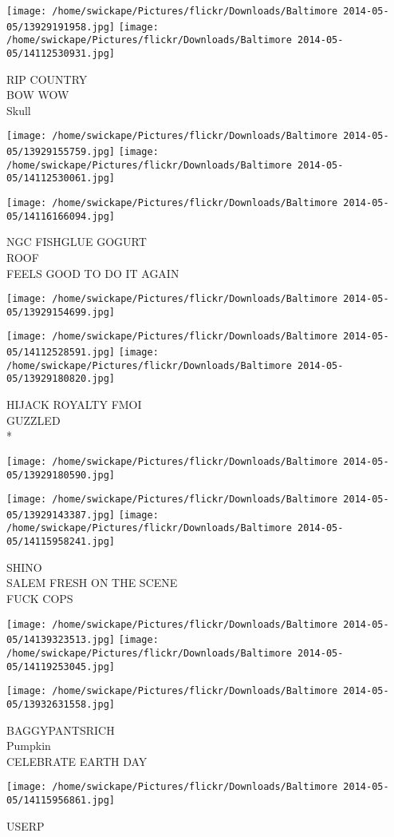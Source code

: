 \documentclass[10pt,letterpaper]{article}
\begin{document}
\vspace{0.25in}
\texttt{[image: /home/swickape/Pictures/flickr/Downloads/Baltimore 2014-05-05/13929191958.jpg]}
\texttt{[image: /home/swickape/Pictures/flickr/Downloads/Baltimore 2014-05-05/14112530931.jpg]}

RIP COUNTRY\\
BOW WOW\\
Skull
\pagebreak

\texttt{[image: /home/swickape/Pictures/flickr/Downloads/Baltimore 2014-05-05/13929155759.jpg]}
\texttt{[image: /home/swickape/Pictures/flickr/Downloads/Baltimore 2014-05-05/14112530061.jpg]}

\vspace{0.25in}
\texttt{[image: /home/swickape/Pictures/flickr/Downloads/Baltimore 2014-05-05/14116166094.jpg]}

NGC FISHGLUE GOGURT\\
ROOF\\
FEELS GOOD TO DO IT AGAIN
\pagebreak

\texttt{[image: /home/swickape/Pictures/flickr/Downloads/Baltimore 2014-05-05/13929154699.jpg]}

\vspace{0.25in}
\texttt{[image: /home/swickape/Pictures/flickr/Downloads/Baltimore 2014-05-05/14112528591.jpg]}
\texttt{[image: /home/swickape/Pictures/flickr/Downloads/Baltimore 2014-05-05/13929180820.jpg]}

HIJACK ROYALTY FMOI\\
GUZZLED\\
*
\pagebreak

\texttt{[image: /home/swickape/Pictures/flickr/Downloads/Baltimore 2014-05-05/13929180590.jpg]}

\vspace{0.25in}
\texttt{[image: /home/swickape/Pictures/flickr/Downloads/Baltimore 2014-05-05/13929143387.jpg]}
\texttt{[image: /home/swickape/Pictures/flickr/Downloads/Baltimore 2014-05-05/14115958241.jpg]}

SHINO\\
SALEM FRESH ON THE SCENE\\
FUCK COPS
\pagebreak

\texttt{[image: /home/swickape/Pictures/flickr/Downloads/Baltimore 2014-05-05/14139323513.jpg]}
\texttt{[image: /home/swickape/Pictures/flickr/Downloads/Baltimore 2014-05-05/14119253045.jpg]}

\texttt{[image: /home/swickape/Pictures/flickr/Downloads/Baltimore 2014-05-05/13932631558.jpg]}

BAGGYPANTSRICH\\
Pumpkin\\
CELEBRATE EARTH DAY
\pagebreak

\texttt{[image: /home/swickape/Pictures/flickr/Downloads/Baltimore 2014-05-05/14115956861.jpg]}

USERP
\pagebreak
\end{document}
